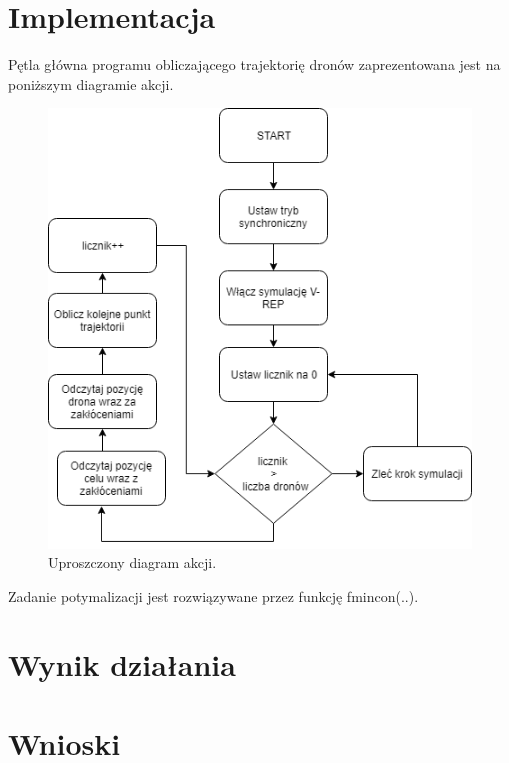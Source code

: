 \documentclass[a4paper, 11pt, oneside]{article}
\begin{document}
\section{Implementacja}
Pętla główna programu obliczającego trajektorię dronów zaprezentowana jest na poniższym diagramie akcji.
\begin{figure}[H]
\centering
\includegraphics[scale=0.5]{uproszczony_digram_akcji.png}
\caption{Uproszczony diagram akcji.}

\end{figure}
Zadanie potymalizacji jest rozwiązywane przez funkcję fmincon(..).
\section{Wynik działania}
\section{Wnioski}
\end{document}

